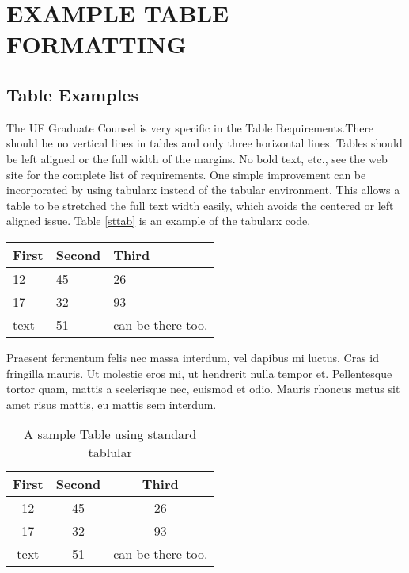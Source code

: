 \chapter{EXAMPLE TABLE FORMATTING} \label{lit}

\section{Table Examples}

 The UF Graduate Counsel is very specific in the Table Requirements.There should be no vertical lines in tables and only three horizontal lines. Tables should be left aligned or the full width of the margins. No bold text, etc., see the web site for the complete list of requirements. One simple improvement can be incorporated by using tabularx instead of the tabular environment. This allows a table to be stretched the full text width easily, which avoids the centered or left aligned issue. Table \ref{sttab} is an example of the tabularx code. 
 
\begin{table}[htbp]%
    \label{sample}
    \begin{tabularx}{6.5in}{XXX}
      \hline
      First & Second & Third \\
      \hline
      12 & 45 & 26 \\
      17 & 32 & 93 \\
      text & 51 & can be there too. \\	
      \hline
    \end{tabularx}
\end{table}
 
 Praesent fermentum felis nec massa interdum, vel dapibus mi luctus. Cras id fringilla mauris. Ut molestie eros mi, ut hendrerit nulla tempor et. Pellentesque tortor quam, mattis a scelerisque nec, euismod et odio. Mauris rhoncus metus sit amet risus mattis, eu mattis sem interdum.

 \begin{table}[t!]
    \caption{A sample Table using standard tablular}\label{tab}
    \begin{tabular}{c c c}
      \hline
      First & Second & Third \\
      \hline
      12 & 45 & 26 \\
      17 & 32 & 93 \\
      text & 51 & can be there too. \\	
      \hline
    \end{tabular}
\end{table}


